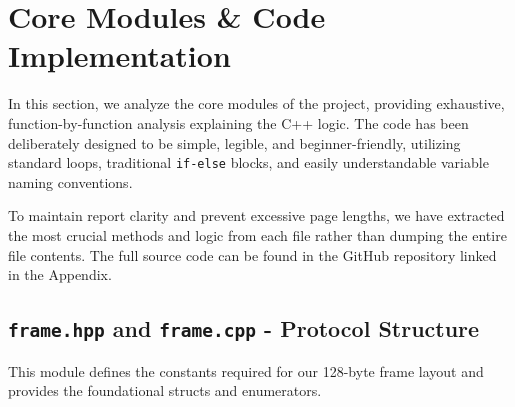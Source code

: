 \documentclass[12pt, a4paper]{article}
\begin{document}
\section{Core Modules \& Code Implementation}
In this section, we analyze the core modules of the project, providing exhaustive, function-by-function analysis explaining the C++ logic. The code has been deliberately designed to be simple, legible, and beginner-friendly, utilizing standard loops, traditional \texttt{if-else} blocks, and easily understandable variable naming conventions. 

To maintain report clarity and prevent excessive page lengths, we have extracted the most crucial methods and logic from each file rather than dumping the entire file contents. The full source code can be found in the GitHub repository linked in the Appendix.

\subsection{\texttt{frame.hpp} and \texttt{frame.cpp} - Protocol Structure}
This module defines the constants required for our 128-byte frame layout and provides the foundational structs and enumerators.
\end{document}
